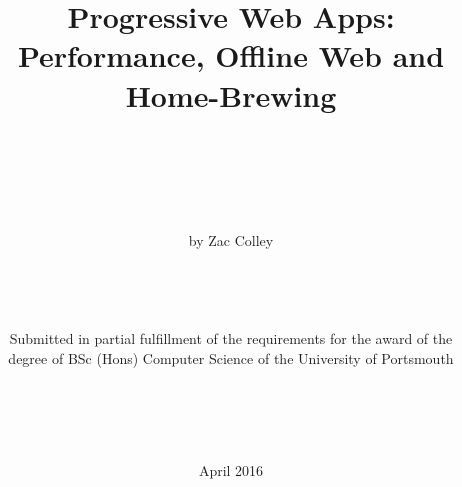 \title{\bfseries Progressive Web Apps:\\Performance, Offline Web and Home-Brewing}
\author{\\\\\\\\\\by Zac Colley\\\\\\\\\\Submitted in partial fulfillment of the requirements for the award of the\\ degree of BSc (Hons) Computer Science of the University of Portsmouth\\\\\\\\\\}
\date{April 2016}
